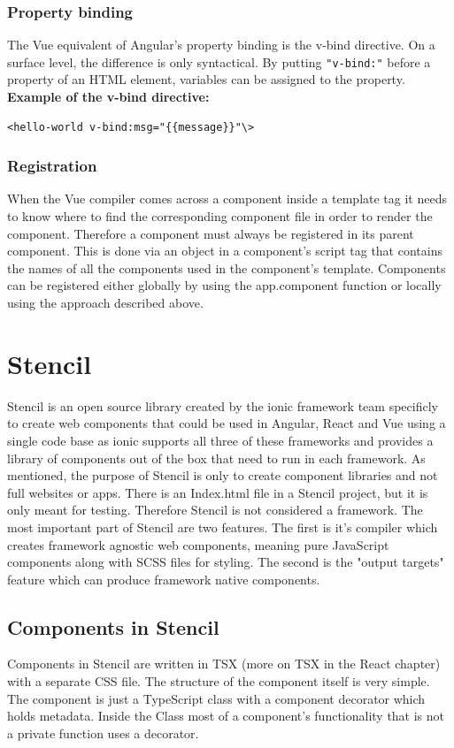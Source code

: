 \subsubsection{Property binding}
The Vue equivalent of Angular's property binding is the v-bind directive. On a surface level, the difference is only syntactical. By putting \verb+"v-bind:"+
before a property of an HTML element, variables can be assigned to the property.\\
\textbf{Example of the v-bind directive:}
\begin{Verbatim}[frame=single]
 <hello-world v-bind:msg="{{message}}"\>
\end{Verbatim}
\subsubsection{Registration}
When the Vue compiler comes across a component inside a template tag it needs to know where to find the corresponding component file in order to render the component. Therefore a component must always be registered in its parent component. This is done via an object in a component's script tag that contains the names of all the components used in the component's template.
Components can be registered either globally by using the app.component function or locally using the approach described above.

\section{Stencil}
Stencil is an open source library created by the ionic framework team specificly to create web components that could be used in Angular, React and Vue using a single code base as ionic supports all three of these frameworks and provides a library of components out of the box that need to run in each framework. As mentioned, the purpose of Stencil is only to create component libraries and not full websites or apps. There is an Index.html file in a Stencil project, but it is only meant for testing. Therefore Stencil is not considered a framework. The most important part of Stencil are two features. The first is it's compiler which creates framework agnostic web  components, meaning pure JavaScript components along with SCSS files for styling. The second is the "output targets" feature which can produce framework native components.

\subsection{Components in Stencil}
Components in Stencil are written in TSX (more on TSX in the React chapter) with a separate CSS file. The structure of the component itself is very simple. The component is just a TypeScript class with a component decorator which holds metadata. Inside the Class most of a component's functionality that is not a private function uses a decorator.

